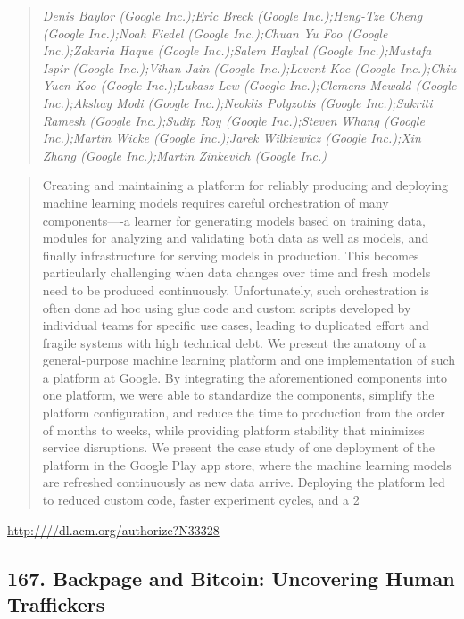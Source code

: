 \documentclass{article}
\begin{document}
\begin{quote}
\footnotesize{\textit{Denis Baylor (Google Inc.);Eric Breck (Google Inc.);Heng-Tze Cheng (Google Inc.);Noah Fiedel (Google Inc.);Chuan Yu Foo (Google Inc.);Zakaria Haque (Google Inc.);Salem Haykal (Google Inc.);Mustafa Ispir (Google Inc.);Vihan Jain (Google Inc.);Levent Koc (Google Inc.);Chiu Yuen Koo (Google Inc.);Lukasz Lew (Google Inc.);Clemens Mewald (Google Inc.);Akshay Modi (Google Inc.);Neoklis Polyzotis (Google Inc.);Sukriti Ramesh (Google Inc.);Sudip Roy (Google Inc.);Steven Whang (Google Inc.);Martin Wicke (Google Inc.);Jarek Wilkiewicz (Google Inc.);Xin Zhang (Google Inc.);Martin Zinkevich (Google Inc.)}}

\end{quote}

\begin{quote}
Creating and maintaining a platform for reliably producing and deploying machine learning models requires careful orchestration of many components—-a learner for generating models based on training data, modules for analyzing and validating both data as well as models, and finally infrastructure for serving models in production. This becomes particularly challenging when data changes over time and fresh models need to be produced continuously. Unfortunately, such orchestration is often done ad hoc using glue code and custom scripts developed by individual teams for specific use cases, leading to duplicated effort and fragile systems with high technical debt. We present the anatomy of a general-purpose machine learning platform and one implementation of such a platform at Google. By integrating the aforementioned components into one platform, we were able to standardize the components, simplify the platform configuration, and reduce the time to production from the order of months to weeks, while providing platform stability that minimizes service disruptions. We present the case study of one deployment of the platform in the Google Play app store, where the machine learning models are refreshed continuously as new data arrive. Deploying the platform led to reduced custom code, faster experiment cycles, and a 2%
\end{quote}

\href{http:////dl.acm.org/authorize?N33328}{http:////dl.acm.org/authorize?N33328}

\subsection{167. Backpage and Bitcoin: Uncovering Human Traffickers}
\end{document}
